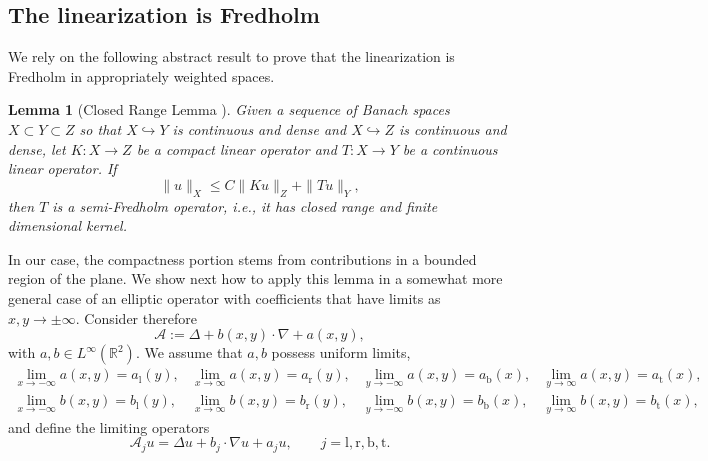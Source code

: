 \documentclass[10pt]{article}
\newtheorem{Lemma}{Lemma}[section]
\newcommand{\R}{\mathbb{R}}
\renewcommand{\leq}{\leqslant}
\begin{document}
\subsection{The linearization is Fredholm}\label{s:3.1}
We rely on the following abstract result to prove that the linearization is Fredholm in appropriately weighted spaces.  %
\begin{Lemma}[Closed Range Lemma {\cite[Prop. 6.7]{Taylor}}]\label{Abstract_Closed_Range_Lemma}
Given a sequence of Banach spaces $X \subset Y \subset Z$ so that $X \hookrightarrow Y$ is continuous and dense and  $X \hookrightarrow Z$ is continuous and dense, let $K: X \to Z$ be a compact linear operator and $T: X \to Y$ be a continuous linear operator. If 
%
\begin{equation*}  
\|u\|_X \leq C\|Ku \|_Z + \|Tu\|_Y,
\end{equation*}
then $T$ is a semi-Fredholm operator, i.e., it has closed range and finite dimensional kernel. 
\end{Lemma}
%
In our case, the compactness portion stems from contributions in a bounded region of the plane. We show next how to apply this lemma in a somewhat more general case of an elliptic operator with coefficients that have limits as $x,y\to\pm\infty$. Consider therefore 
%
\begin{equation}\label{e:a}
\mathcal{A} := \Delta + b(x,y)\cdot \nabla  + a(x,y),
\end{equation}
%
with $a,b\in L^\infty(\R^2)$. We assume that $a,b$ possess uniform limits,
\begin{equation}\label{e:al}\begin{array}{llll}
\lim_{x\to -\infty} a(x,y)=a_\mathrm{l}(y),& \lim_{x\to \infty} a(x,y)=a_\mathrm{r}(y), & 
\lim_{y\to -\infty} a(x,y)=a_\mathrm{b}(x),& \lim_{y\to \infty} a(x,y)=a_\mathrm{t}(x),\\
\lim_{x\to -\infty} b(x,y)=b_\mathrm{l}(y),& \lim_{x\to \infty} b(x,y)=b_\mathrm{r}(y),& 
\lim_{y\to -\infty} b(x,y)=b_\mathrm{b}(x),& \lim_{y\to \infty} b(x,y)=b_\mathrm{t}(x),
\end{array}
\end{equation}
and define the limiting operators 
\begin{equation}\label{e:alim}
\mathcal{A}_ju=\Delta u + b_j\cdot \nabla u  + a_j u,\qquad j=\mathrm{l,r,b,t}.
\end{equation}
% 
% 
\end{document}
